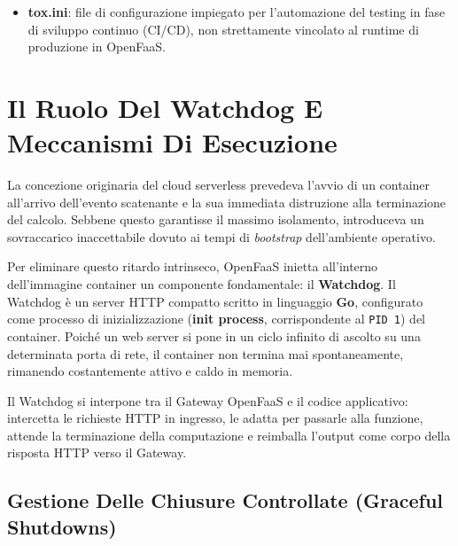 \documentclass[11pt, a4paper]{article}
\begin{document}
\begin{itemize}
\begin{itemize}
        \item \textbf{\_\_init\_\_.py}: file convenzionale che trasforma la directory \texttt{function} in un modulo importabile all'interno dell'interprete Python.
        \item \textbf{handler\_test.py}: modulo predisposto per l'esecuzione di test unitari automatizzati della logica applicativa.
    \end{itemize}
    \item \textbf{tox.ini}: file di configurazione impiegato per l'automazione del testing in fase di sviluppo continuo (CI/CD), non strettamente vincolato al runtime di produzione in OpenFaaS.
\end{itemize}

\newpage


\section{Il Ruolo Del Watchdog E Meccanismi Di Esecuzione}

La concezione originaria del cloud serverless prevedeva l'avvio di un container all'arrivo dell'evento scatenante e la sua immediata distruzione alla terminazione del calcolo. Sebbene questo garantisse il massimo isolamento, introduceva un sovraccarico inaccettabile dovuto ai tempi di \emph{bootstrap} dell'ambiente operativo.

Per eliminare questo ritardo intrinseco, OpenFaaS inietta all'interno dell'immagine container un componente fondamentale: il \textbf{Watchdog}. Il Watchdog è un server HTTP compatto scritto in linguaggio \textbf{Go}, configurato come processo di inizializzazione (\textbf{init process}, corrispondente al \texttt{PID 1}) del container. Poiché un web server si pone in un ciclo infinito di ascolto su una determinata porta di rete, il container non termina mai spontaneamente, rimanendo costantemente attivo e caldo in memoria.

Il Watchdog si interpone tra il Gateway OpenFaaS e il codice applicativo: intercetta le richieste HTTP in ingresso, le adatta per passarle alla funzione, attende la terminazione della computazione e reimballa l'output come corpo della risposta HTTP verso il Gateway.

\subsection{Gestione Delle Chiusure Controllate (Graceful Shutdowns)}
\end{document}
